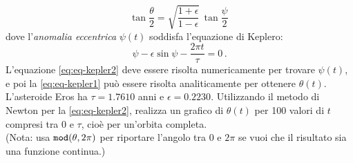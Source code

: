 \documentclass[letterpaper, 12pt]{article}
\begin{document}
\begin{equation}
    \label{eq:eq-kepler1}
    \tan \frac{\theta}{2} = \sqrt{\frac{1+\epsilon}{1-\epsilon}}\,
    \tan \frac{\psi}{2}\,
\end{equation}
dove l'\textit{anomalia eccentrica} $\psi(t)$ soddisfa l'equazione di Keplero:
\begin{equation}
    \label{eq:eq-kepler2}
    \psi - \epsilon \sin \psi - \frac{2\pi t}{\tau} = 0\,.
\end{equation}
L'equazione \ref{eq:eq-kepler2} deve essere risolta numericamente per trovare $\psi(t)$, 
e poi la \ref{eq:eq-kepler1} può essere risolta analiticamente per ottenere $\theta(t)$.
L'asteroide Eros ha $\tau=1.7610$ anni e $\epsilon=0.2230$. Utilizzando il metodo di Newton per la \ref{eq:eq-kepler2}, 
realizza un grafico di $\theta(t)$ per 100 valori di $t$ compresi tra $0$ e $\tau$, cioè per un'orbita completa.\\
(Nota: usa $\verb|mod|(\theta,2\pi)$ per riportare l'angolo tra 0 e $2\pi$ se vuoi che il risultato 
sia una funzione continua.)
\end{document}

